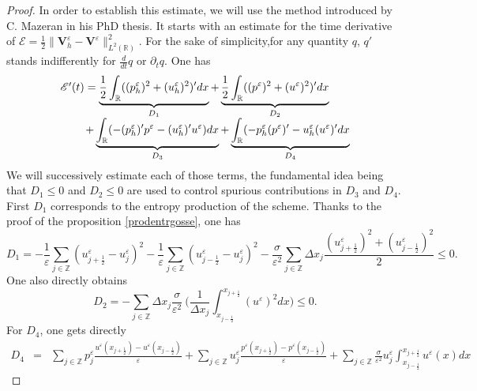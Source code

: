 \documentclass[a4paper,french,english,10pt]{article}
\newcommand\eps{\varepsilon}
\begin{document}
\begin{proof}
In order to establish this estimate, we will use the method introduced by C.
Mazeran \cite{Mazeran} in his PhD thesis.
It  starts with an estimate for the time derivative of
$\mathscr{E}=\frac12 \|\mathbf V_h^\eps - \mathbf V^\eps  \|^2_{L^2(\mathbb{R})}$.
For the sake of simplicity,for any quantity $q$,   $q'$ stands indifferently for  $\frac{d}{dt}q $ or $\partial_t q $. One has 
\begin{equation*}\label{esti}
\begin{array}{l}
\mathscr{E}'(t) = \underbrace{\frac12 
\int_{\mathbb{R}}((p_{h}^{\eps})^2+(u_{h}^{\eps})^2)'dx}_{D_1}+
\underbrace{\frac12 
\int_{\mathbb{R}}((p^{\eps})^2+(u^{\eps})^2)'dx}_{D_2} \\
\hspace{0.8cm}
+ \underbrace{\int_{\mathbb{R}}
(-(p_{h}^{\eps})'p^\eps-(u_{h}^{\eps})'u^\eps)dx}_{D_3} + \underbrace{\int_{\mathbb{R}}
(-p_{h}^{\eps}(p^{\eps})'-u_{h}^{\eps}(u^{\eps})'dx}_{D_4}
\end{array}
\end{equation*}
We will successively estimate each of those terms,
the fundamental idea being that
$D_1\leq 0$ and $D_2\leq 0$ are used to control 
spurious contributions in $D_3$ and $D_4$.
First $D_1$ corresponds to the
entropy production of the scheme. Thanks to the proof of
the proposition \ref{prodentrgosse},
one has
\begin{equation*}
 D_1 = -\frac{1}{\eps}\sum_{j\in \mathbb{Z}}
(u_{j+\frac12 }^{\eps}-u^{\eps}_j)^2 -\frac{1}{\eps} \sum_{j\in
\mathbb{Z}}(u_{j-\frac12 }^{\eps}-u^{\eps}_j)^2-
\frac{\sigma}{\eps^2}\sum_{j\in \mathbb{Z}} \Delta x_{j}
\frac{(u_{j+\frac12 }^{\eps})^2+(u_{j-\frac12 }^{\eps})^2}{2}\leq 0.
\end{equation*}
One also directly obtains
\begin{equation*}
 D_2 = -\sum_{j\in \mathbb{Z}} \Delta x_j \frac{ \sigma }{\eps^2} \: \bigg(
\frac{1}{\Delta x_j}{\int_{x_{j-\frac12}}^{x_{j+\frac12}}}(u^{\eps})^2 dx \bigg)
\leq 0.
\end{equation*}
For $D_4$, one gets  directly
\begin{eqnarray*}
 D_4 &=& \sum_{j\in \mathbb{Z}} p^{\eps}_j
\frac{u^{\eps}(x_{j+\frac12 })-u^{\eps}(x_{j-\frac12 })}{\eps} +
\sum_{j\in \mathbb{Z}} u^{\eps}_j 
\frac{p^{\eps}(x_{j+\frac12 })-p^{\eps}(x_{j-\frac12 })}{\eps} +
\sum_{j\in \mathbb{Z}} \frac{\sigma}{\eps^2} u^{\eps}_j 
{\int_{x_{j-\frac12}}^{x_{j+\frac12}}} u^{\eps}(x) dx 
\end{eqnarray*}

\end{proof}
\end{document}
